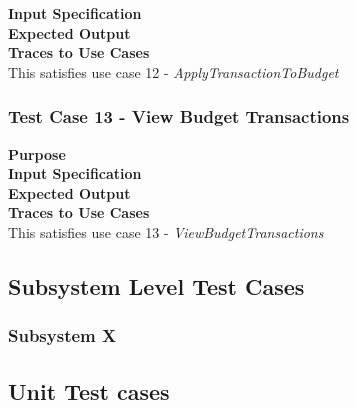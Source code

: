 \documentclass[12pt]{article}
\begin{document}
\noindent
{\bf Input Specification}\\

\noindent
{\bf Expected Output}\\

\noindent
{\bf Traces to Use Cases}\\
This satisfies use case 12 - \textit{ApplyTransactionToBudget}
\clearpage %


\subsubsection{Test Case 13 - View Budget Transactions} \label{TC-13}
\noindent
{\bf Purpose}\\
                                                        
\noindent
{\bf Input Specification}\\

\noindent
{\bf Expected Output}\\

\noindent
{\bf Traces to Use Cases}\\
This satisfies use case 13 - \textit{ViewBudgetTransactions}


\subsection{Subsystem Level Test Cases}

\subsubsection{Subsystem X}
\clearpage
\subsection{Unit Test cases}

\end{document}
